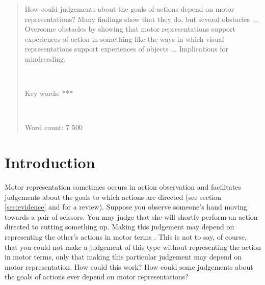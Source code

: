 \documentclass[12pt,\papersize]{extarticle}
\begin{document}
\setlength\footnotesep{1em}


\maketitle
\title{}





\begin{abstract}
\noindent
%
How could judgements about the goals of actions depend on motor representations? Many findings show that they do, but several obstacles ... Overcome obstacles by showing that motor representations support experiences of action in something like the ways in which visual representations support experiences of objects ... Implications for mindreading.
%

\ %

\noindent
Key words: ***

\ %

\noindent
Word count: 7 500
\end{abstract}









\section{Introduction}

Motor representation sometimes occurs in action observation and facilitates judgements about the goals to which actions are directed (see section \vref{sec:evidence} and \citealp{rizzolatti_functional_2010} for a review). 
Suppose you observe someone's hand moving towards a pair of scissors. 
You may judge that she will shortly perform an action directed to cutting something up. 
Making this judgement may depend on representing the other's actions in motor terms \citep{boria:2009_intention, ortigue:2010_understanding}.  
This is not to say, of course, that you could not make a judgement of this type without representing the action in motor terms, only that making this particular judgement may depend on motor representation. 
How could this work? 
How could some judgements about the goals of actions ever depend on motor representations?
\end{document}
